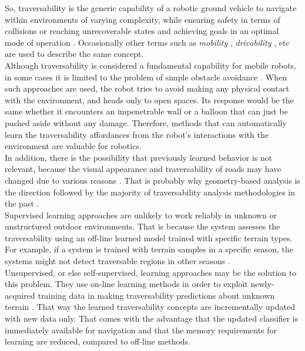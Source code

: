 \documentclass[12pt,a4paper,table,dvipsnames,tikz]{report}
\newcommand{\term}{\textit}
\begin{document}
	So, traversability is the generic capability of a robotic ground 
	vehicle to navigate within environments of varying complexity, while ensuring 
	safety in terms of collisions or reaching unrecoverable states and achieving 
	goals in an optimal mode of operation \citep{Papadakis}. Occasionally other 
	terms such as \term{mobility} \citep{Lalonde}, \term{drivability} \citep{Droeschel}, 
	etc are used to describe the same concept.
	\\
	
	Although traversability is considered a fundamental capability for mobile 
	robots, in some cases it is limited to the problem of simple obstacle avoidance 
	\citep{Ugur}. When such approaches are used, the robot tries to avoid making any 
	physical contact with the environment, and heads only to open spaces. Its 
	response would be the same whether it encounters an impenetrable wall or a 
	balloon that can just be pushed aside without any damage. Therefore, methods 
	that can automatically learn the traversability affordances from the 
	robot’s interactions with the environment are valuable for robotics.
	\\
		
	In addition, there is the possibility that previously learned behavior is not 
	relevant, because the visual appearance and traversability of roads may 
	have changed due to various reasons \citep{Wigness}. That is probably why 
	geometry-based analysis is the direction followed by the majority of 
	traversability analysis methodologies in the past \citep{Papadakis}.
	\\
	
	Supervised learning approaches are unlikely to work reliably in unknown or 
	unstructured outdoor environments. That is because the system assesses the 
	traversability using an off-line learned model trained with specific 
	terrain types. For example, if a system is trained with terrain samples in a 
	specific season, the systems might not detect traversable regions in other 
	seasons \citep{Lee}.
	\\
	
	Unsupervised, or else self-supervised, learning approaches may be the solution 
	to this problem. They use on-line learning methods in order to exploit newly-
	acquired training data in making traversability predictions about unknown 
	terrain \citep{Kim}. That way the learned traversability concepts are 
	incrementally updated with new data only. That comes with the advantage that the 
	updated classifier is immediately available for navigation and that the memory 
	requirements for learning are reduced, compared to off-line methods.
	\\
	
\end{document}
